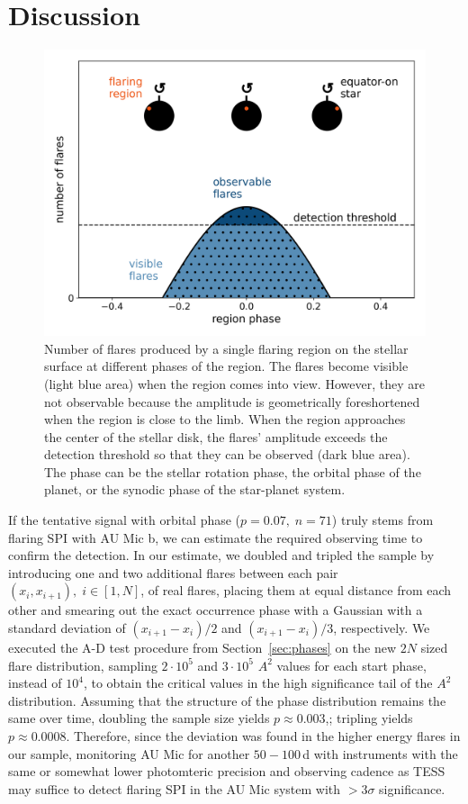 \documentclass[fleqn,usenatbib]{mnras}%
\begin{document}
\section{Discussion}
\label{sec:discussion}
\begin{figure}
\includegraphics[width=\hsize]{figures/observability_illustration.png} 
\caption{Number of flares produced by a single flaring region on the stellar surface at different phases of the region. The flares become visible (light blue area) when the region comes into view. However, they are not observable because the amplitude is geometrically foreshortened when the region is close to the limb. When the region approaches the center of the stellar disk, the flares' amplitude exceeds the detection threshold so that they can be observed (dark blue area). The phase can be the stellar rotation phase, the orbital phase of the planet, or the synodic phase of the star-planet system.}
\label{fig:observability}
\end{figure}

If the tentative signal with orbital phase \mbox{($p=0.07,\;n=71$)} truly stems from flaring SPI with AU Mic b, we can estimate the required observing time to confirm the detection. In our estimate, we doubled and tripled the sample by introducing one and two additional flares between each pair $(x_i,x_{i+1}),\;i \in [1,N]$, of real flares, placing them at equal distance from each other and smearing out the exact occurrence phase with a Gaussian with a standard deviation of $(x_{i+1}-x_i)/2$ and $(x_{i+1}-x_i)/3$, respectively. We executed the A-D test procedure from Section~\ref{sec:phases} on the new $2N$ sized flare distribution, sampling $2\cdot 10^5$ and $3\cdot 10^5$ $A^2$ values for each start phase, instead of $10^4$, to obtain the critical values in the high significance tail of the $A^2$ distribution. Assuming that the structure of the phase distribution remains the same over time, doubling the sample size yields $p\approx 0.003$,; tripling yields $p\approx0.0008$. Therefore, since the deviation was found in the higher energy flares in our sample, monitoring AU Mic for another $50-100\,$d with instruments with the same or somewhat lower photomteric precision and observing cadence as TESS may suffice to detect flaring SPI in the AU Mic system with $>3\sigma$ significance.
\end{document}
